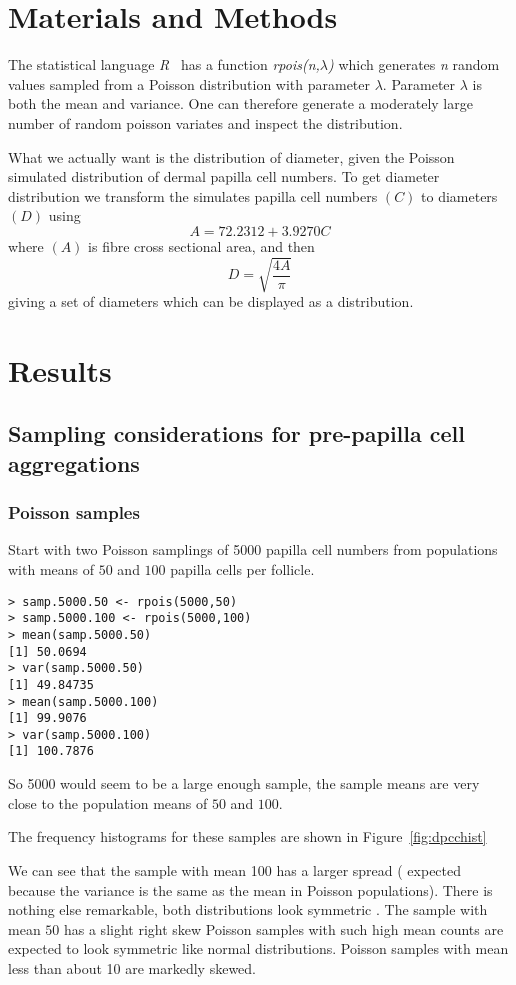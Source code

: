\documentclass[titlepage]{article}  %
\begin{document}
\clearpage
\section{Materials and Methods}
The statistical language {\em R}~\cite{rprog:13} has a function {\em rpois(n,$\lambda$)} which generates {\em n} random values sampled from a Poisson distribution with parameter {\em $\lambda$}. Parameter {\em $\lambda$} is both the mean and variance. One can therefore generate a moderately large number of random poisson variates and inspect the distribution.

What we actually want is the distribution of diameter, given the Poisson simulated distribution of dermal papilla cell numbers. To get diameter distribution we transform the simulates papilla cell numbers $(C)$ to diameters $(D)$ using
\begin{displaymath}
A = 72.2312 + 3.9270C
\end{displaymath}
where $(A)$ is fibre cross sectional area, and then
\begin{displaymath}
D = \sqrt{\frac{4A}{\pi}}
\end{displaymath}
giving a set of diameters which can be displayed as a distribution.


\clearpage
\section{Results}
\subsection{Sampling considerations for pre-papilla cell aggregations}
\subsubsection{Poisson samples}
Start with two Poisson samplings of 5000 papilla cell numbers from populations with means of $50$ and $100$ papilla cells per follicle. 
\begin{verbatim}
> samp.5000.50 <- rpois(5000,50)
> samp.5000.100 <- rpois(5000,100)
> mean(samp.5000.50)
[1] 50.0694
> var(samp.5000.50)
[1] 49.84735
> mean(samp.5000.100)
[1] 99.9076
> var(samp.5000.100)
[1] 100.7876
\end{verbatim}

So 5000 would seem to be a large enough sample, the sample means are very close to the population means of $50$ and $100$.

The frequency histograms for these samples are shown in Figure~\ref{fig:dpcchist}

We can see that the sample with mean 100 has a larger spread ( expected because the variance is the same as the mean in Poisson populations). There is nothing else remarkable, both distributions look symmetric . The sample with mean $50$ has a slight right skew
Poisson samples with such high mean counts are expected to look symmetric like  normal distributions. Poisson samples with mean less than about 10 are markedly skewed. 
\end{document}
